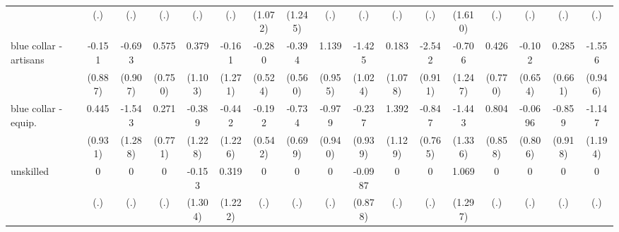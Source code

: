 {\begin{tabular}{l*{16}{c}}
                    &         (.)         &         (.)         &         (.)         &         (.)         &         (.)         &     (1.072)         &     (1.245)         &         (.)         &         (.)         &         (.)         &         (.)         &     (1.610)         &         (.)         &         (.)         &         (.)         &         (.)         \\
[1em]
blue collar - artisans&      -0.151         &      -0.693         &       0.575         &       0.379         &      -0.161         &      -0.280         &      -0.394         &       1.139         &      -1.425         &       0.183         &      -2.542\sym{**} &      -0.706         &       0.426         &      -0.102         &       0.285         &      -1.556         \\
                    &     (0.887)         &     (0.907)         &     (0.750)         &     (1.103)         &     (1.271)         &     (0.524)         &     (0.560)         &     (0.955)         &     (1.024)         &     (1.078)         &     (0.911)         &     (1.247)         &     (0.770)         &     (0.654)         &     (0.661)         &     (0.946)         \\
[1em]
blue collar - equip.&       0.445         &      -1.543         &       0.271         &      -0.389         &      -0.442         &      -0.192         &      -0.734         &      -0.979         &      -0.237         &       1.392         &      -0.847         &      -1.443         &       0.804         &     -0.0696         &      -0.859         &      -1.147         \\
                    &     (0.931)         &     (1.288)         &     (0.771)         &     (1.228)         &     (1.226)         &     (0.542)         &     (0.699)         &     (0.940)         &     (0.939)         &     (1.129)         &     (0.765)         &     (1.336)         &     (0.858)         &     (0.806)         &     (0.918)         &     (1.194)         \\
[1em]
unskilled           &           0         &           0         &           0         &      -0.153         &       0.319         &           0         &           0         &           0         &     -0.0987         &           0         &           0         &       1.069         &           0         &           0         &           0         &           0         \\
                    &         (.)         &         (.)         &         (.)         &     (1.304)         &     (1.222)         &         (.)         &         (.)         &         (.)         &     (0.878)         &         (.)         &         (.)         &     (1.297)         &         (.)         &         (.)         &         (.)         &         (.)         \\

\end{tabular}}
